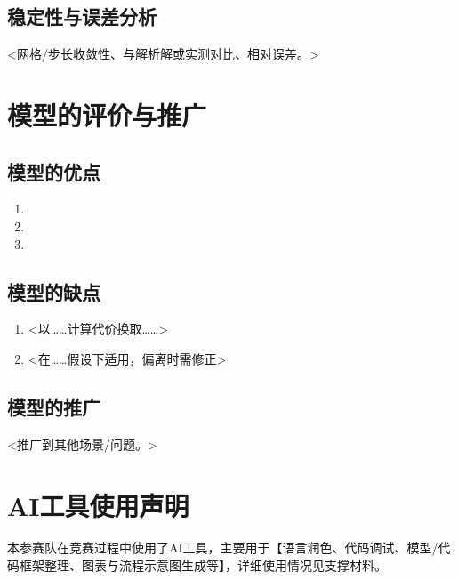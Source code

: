 \documentclass[11pt]{ctexart}
\begin{document}
\subsection{稳定性与误差分析}
<网格/步长收敛性、与解析解或实测对比、相对误差。>

\section{模型的评价与推广}
\subsection{模型的优点}
\begin{enumerate}[leftmargin=2em,itemsep=1pt]
\item <优点 1>
\item <优点 2>
\item <优点 3>
\end{enumerate}
\subsection{模型的缺点}
\begin{enumerate}[leftmargin=2em,itemsep=1pt]
\item <以……计算代价换取……>
\item <在……假设下适用，偏离时需修正>
\end{enumerate}
\subsection{模型的推广}
<推广到其他场景/问题。>

\section*{AI工具使用声明}
本参赛队在竞赛过程中使用了AI工具，主要用于【语言润色、代码调试、模型/代码框架整理、图表与流程示意图生成等】，详细使用情况见支撑材料。

\end{document}
